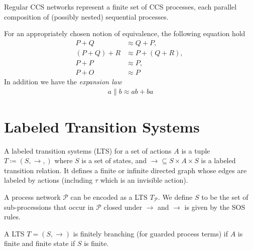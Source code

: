 \begin{remark}
    Regular CCS networks represent a finite set of CCS processes, each parallel composition of (possibly nested) sequential processes.
\end{remark}




\begin{theorem}[Laws]
For an appropriately chosen notion of equivalence, the following equation hold
\begin{align*}
    P + Q  &\approx Q + P, \; \\
    (P + Q) + R &\approx P + (Q + R), \;\\
    P + P &\approx P, \; \\
    P + O &\approx P
\end{align*}
In addition we have the \emph{expansion law}
\begin{align*}
    a \parallel  b \approx ab + ba
\end{align*}
\end{theorem}



\section{Labeled Transition Systems}

\begin{definition}
    A labeled transition systems (LTS) for a set of actions $A$ is a tuple $T\coloneqq (S, \to, )$ where $S$ is a set of states, and $\to \subseteq S\times A \times S$ is a labeled transition relation. It defines a finite or infinite directed graph whose edges are labeled by actions (including $\tau$ which is an invisible action).
\end{definition}


\begin{example}
    A process network $\mathcal{P}$ can be encoded as a LTS $T_{\mathcal{P}}$.
    We define $S$ to be the set of sub-processions that occur in  $\mathcal{P}$ closed under $\to$ and 
    $\to$ is given by the SOS rules. 
\end{example}


\begin{remark}
    A LTS $T=(S, \to)$ is finitely branching (for guarded process terms) if $A$ is finite and finite state if $S$ is finite. 
\end{remark}





